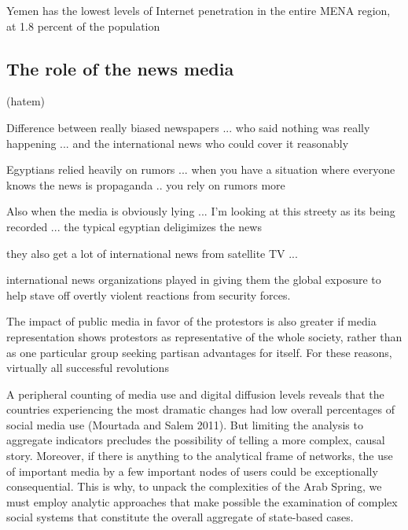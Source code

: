 		
		Yemen has the lowest levels of Internet penetration in the entire MENA region, at 1.8 percent of the population
		
	
	
	
	





\subsection{The role of the news media}

(hatem)

Difference between really biased newspapers ... who said nothing was really happening ... and the international news who could cover it reasonably

Egyptians relied heavily on rumors ... when you have a situation where everyone knows the news is propaganda .. you rely on rumors more  

    Also when the media is obviously lying ... I'm looking at this streety as its being recorded ... the typical egyptian deligimizes the news

	they also get a lot of international news from satellite TV ... 

\cite{hussain_what_2013}
 international news organizations played in giving them the global exposure
to help stave off overtly violent reactions from security forces.


\citep{goldstone_cross-class_2011}

The impact
of public media in favor of the protestors is also greater if media representation shows
protestors as representative of the whole society, rather than as one particular group
seeking partisan advantages for itself.
For these reasons, virtually all successful revolutions

\citep{goldstone_bringing_2013}

A peripheral
counting of media use and digital diffusion levels reveals that the countries
experiencing the most dramatic changes had low overall percentages of social
media use (Mourtada and Salem 2011). But limiting the analysis to aggregate
indicators precludes the possibility of telling a more complex, causal story. Moreover,
if there is anything to the analytical frame of networks, the use of important
media by a few important nodes of users could be exceptionally
consequential. This is why, to unpack the complexities of the Arab Spring, we
must employ analytic approaches that make possible the examination of complex
social systems that constitute the overall aggregate of state-based cases.




